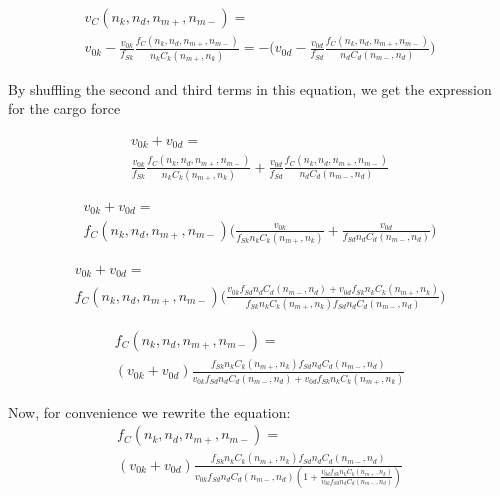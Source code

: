 \begin{equation}
\begin{split}
v_C(n_k, n_d, n_{m+}, n_{m-}) =\\ v_{0k}-\frac{v_{0k}}{f_{Sk}}\frac{f_C(n_k, n_d, n_{m+}, n_{m-})}{n_kC_k(n_{m+}, n_k)} =
-\big(v_{0d}-\frac{v_{0d}}{f_{Sd}}\frac{f_C(n_k, n_d, n_{m+}, n_{m-})}{n_dC_d(n_{m-},n_d)}\big)
\end{split}
\end{equation}

By shuffling the second and third terms in this equation, we get the expression for the cargo force

\begin{equation}
\begin{split}
v_{0k} + v_{0d}  = \\
\frac{v_{0k}}{f_{Sk}}\frac{f_C(n_k, n_d, n_{m+}, n_{m-})}{n_kC_k(n_{m+}, n_k)} + \frac{v_{0d}}{f_{Sd}}\frac{f_C(n_k, n_d, n_{m+}, n_{m-})}{n_dC_d(n_{m-},n_d)}
\end{split}
\end{equation}

\begin{equation}
\begin{split}
v_{0k} + v_{0d}  = \\
f_C(n_k, n_d, n_{m+}, n_{m-}) \big( \frac{v_{0k}}{f_{Sk}n_kC_k(n_{m+}, n_k)} + \frac{v_{0d}}{f_{Sd}n_dC_d(n_{m-},n_d)} \big)
\end{split}
\end{equation}

\begin{equation}
\begin{split}
v_{0k} + v_{0d}  = \\
f_C(n_k, n_d, n_{m+}, n_{m-}) \big( \frac{v_{0k}f_{Sd}n_dC_d(n_{m-},n_d) + v_{0d}f_{Sk}n_kC_k(n_{m+}, n_k)}{f_{Sk}n_kC_k(n_{m+}, n_k)f_{Sd}n_dC_d(n_{m-},n_d)} \big)
\end{split}
\end{equation}

\begin{equation}
\begin{split}
f_C(n_k, n_d, n_{m+}, n_{m-}) = \\
(v_{0k} + v_{0d})\frac{f_{Sk}n_kC_k(n_{m+}, n_k)f_{Sd}n_dC_d(n_{m-},n_d)}{v_{0k}f_{Sd}n_dC_d(n_{m-},n_d) + v_{0d}f_{Sk}n_kC_k(n_{m+}, n_k)}
\end{split}
\end{equation}

Now, for convenience we rewrite the equation:
\begin{equation}
\begin{split}
f_C(n_k, n_d, n_{m+}, n_{m-}) = \\
(v_{0k} + v_{0d})\frac{f_{Sk}n_kC_k(n_{m+}, n_k)f_{Sd}n_dC_d(n_{m-},n_d)}
{v_{0k}f_{Sd}n_dC_d(n_{m-},n_d) (1 + \frac{v_{0d}f_{Sk}n_kC_k(n_{m+}, n_k)}{v_{0k}f_{Sd}n_dC_d(n_{m-},n_d)})}
\end{split}
\end{equation}

